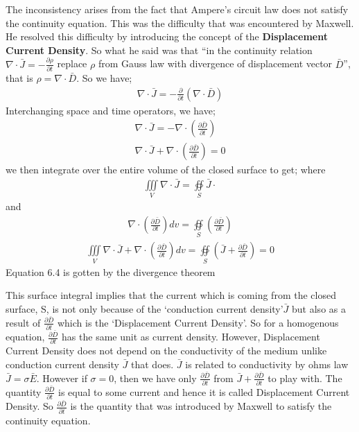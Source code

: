 The inconsistency arises from the fact that Ampere's circuit law does not satisfy the continuity equation. This was the difficulty that was encountered by Maxwell. He resolved this difficulty by introducing the concept of the \textbf{Displacement Current Density}. So what he said was that \textquotedblleft in the continuity relation $\nabla\cdot\bar{J}=-\frac{\partial\rho}{\partial t}$ replace $\rho$ from Gauss law with divergence of displacement vector $\bar{D}$\textquotedblright, that is $\rho=\nabla\cdot\bar{D}$. So we have;
\begin{align}
\nabla\cdot\bar{J}=-\frac{\partial}{\partial t}(\nabla\cdot\bar{D})
\end{align}
Interchanging space and time operators, we have;
\begin{align}
\nabla\cdot\bar{J}=-\nabla\cdot(\frac{\partial\bar{D}}{\partial t})\\
\nabla\cdot\bar{J}+\nabla\cdot(\frac{\partial\bar{D}}{\partial t}) = 0
\end{align}
we then integrate over the entire volume of the closed surface to get;
where 
\begin{align}
	\iiint\limits_V\nabla\cdot\bar{J} = \oiint\limits_S\bar{J}\cdot
\end{align} and
\begin{align}
	\nabla\cdot(\frac{\partial\bar{D}}{\partial t})dv = \oiint\limits_S(\frac{\partial\bar{D}}{\partial t})
\end{align}
\begin{align}
\iiint\limits_V\nabla\cdot\bar{J}+\nabla\cdot(\frac{\partial\bar{D}}{\partial t})dv=
\oiint\limits_S(\bar{J}+\frac{\partial\bar{D}}{\partial t})=0
\end{align}
Equation 6.4 is gotten by the divergence theorem

This surface integral implies that the current which is coming from the closed surface, S, is not only because of the \textquoteleft conduction current density\textquoteright $\bar{J}$ but also as a result of $\frac{\partial\bar{D}}{\partial t}$ which is the \textquoteleft Displacement Current Density\textquoteright. So for a homogenous equation, $\frac{\partial\bar{D}}{\partial t}$ has the same unit as current density. However, Displacement Current Density does not depend on the conductivity of the medium unlike conduction current density $\bar{J}$ that does. $\bar{J}$ is related to conductivity by ohms law $\bar{J}=\sigma\bar{E}$. However if $\sigma=0$, then we have only $\frac{\partial\bar{D}}{\partial t}$ from $\bar{J}+\frac{\partial\bar{D}}{\partial t}$ to play with. The quantity $\frac{\partial\bar{D}}{\partial t}$ is equal to some current and hence it is called Displacement Current Density. So $\frac{\partial\bar{D}}{\partial t}$ is the quantity that was introduced by Maxwell to satisfy the continuity equation.

